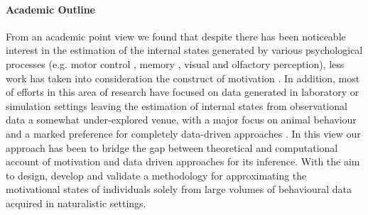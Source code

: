 \paragraph*{Academic Outline}
\label{academic_outline}
From an academic point view we found that despite there has been noticeable interest in the estimation of the internal states generated by various psychological processes (e.g. motor control \cite{gallego2017neural}, memory \cite{derdikman2011manifold, nieh2021geometry}, visual \cite{seung2000manifold, ganmor2015thesaurus} and olfactory \cite{stopfer2003intensity} perception), less work has taken into consideration the construct of motivation \cite{mcclure2003computational, zhang2009neural}. In addition, most of efforts in this area of research have focused on data generated in laboratory or simulation settings \cite{eyjolfsdottir2016learning, song2017reward, merel2019deep,calhoun2019unsupervised, seung2000manifold, pang2016dimensionality, luxem2020identifying, pereira2020quantifying, mccullough2021unsupervised, shi2021learning} leaving the estimation of internal states from observational data a somewhat under-explored venue, with a major focus on animal behaviour and a marked preference for completely data-driven approaches \cite{luxem2020identifying,pereira2020quantifying, mccullough2021unsupervised}. In this view our approach has been to bridge the gap between theoretical and computational account of motivation and data driven approaches for its inference. With the aim to design, develop and validate a methodology for approximating the motivational states of individuals solely from large volumes of behavioural data acquired in naturalistic settings. 

